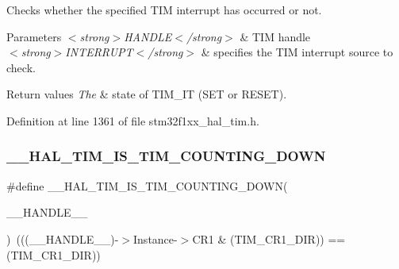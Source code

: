 Checks whether the specified T\+IM interrupt has occurred or not. 


\begin{DoxyParams}{Parameters}
{\em $<$strong$>$\+H\+A\+N\+D\+L\+E$<$/strong$>$} & T\+IM handle \\
\hline
{\em $<$strong$>$\+I\+N\+T\+E\+R\+R\+U\+P\+T$<$/strong$>$} & specifies the T\+IM interrupt source to check. \\
\hline
\end{DoxyParams}

\begin{DoxyRetVals}{Return values}
{\em The} & state of T\+I\+M\+\_\+\+IT (S\+ET or R\+E\+S\+ET). \\
\hline
\end{DoxyRetVals}


Definition at line 1361 of file stm32f1xx\+\_\+hal\+\_\+tim.\+h.

\mbox{\label{group___t_i_m___exported___macros_gac73f5e7669d92971830481e7298e98ba}} 
\subsubsection{\texorpdfstring{\+\_\+\+\_\+\+H\+A\+L\+\_\+\+T\+I\+M\+\_\+\+I\+S\+\_\+\+T\+I\+M\+\_\+\+C\+O\+U\+N\+T\+I\+N\+G\+\_\+\+D\+O\+WN}{\_\_HAL\_TIM\_IS\_TIM\_COUNTING\_DOWN}}
{\footnotesize\ttfamily \#define \+\_\+\+\_\+\+H\+A\+L\+\_\+\+T\+I\+M\+\_\+\+I\+S\+\_\+\+T\+I\+M\+\_\+\+C\+O\+U\+N\+T\+I\+N\+G\+\_\+\+D\+O\+WN(\begin{DoxyParamCaption}\item[{}]{\+\_\+\+\_\+\+H\+A\+N\+D\+L\+E\+\_\+\+\_\+ }\end{DoxyParamCaption})~(((\+\_\+\+\_\+\+H\+A\+N\+D\+L\+E\+\_\+\+\_\+)-\/$>$Instance-\/$>$C\+R1 \& (T\+I\+M\+\_\+\+C\+R1\+\_\+\+D\+IR)) == (T\+I\+M\+\_\+\+C\+R1\+\_\+\+D\+IR))}



